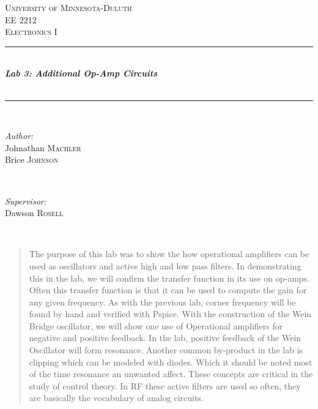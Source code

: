 \documentclass[10pt,a4paper]{article}
\begin{document}
\begin{titlepage}
\newcommand{\HRule}{\rule{\linewidth}{0.5mm}} %
\center %
\textsc{\LARGE University of Minnesota-Duluth}\\[1.5cm] %
\textsc{\Large EE 2212}\\[0.5cm] %
\textsc{\large Electronics I}\\[0.5cm] %
\HRule \\[0.4cm]
{ \huge \bfseries \emph{{\color{black}Lab 3: Additional Op-Amp Circuits  }}}\\[0.4cm] %
{\color{black}{\large \today}}\\
\HRule \\[1cm]


\begin{minipage}{0.4\textwidth}
\begin{flushleft} \large
\emph{Author:}\\
Johnathan \textsc{Machler}\\
Brice  \textsc{Johnson }
\end{flushleft}
\end{minipage}
~
\begin{minipage}{0.4\textwidth}
\begin{flushright} \large
\emph{Supervisor:} \\
Dawson \textsc{Rosell} %
\end{flushright}


\end{minipage}\\[1cm] %

\begin{abstract}
The purpose of this lab was to show the how operational amplifiers can be used as oscillators and active high and low pass filters. In demonstrating this in the lab, we will confirm the transfer function in its use on op-amps.  Often this transfer function is that it can be used to compute the gain for any given frequency. As with the previous lab, corner frequency will be found by hand and verified with Pspice. With the construction of the Wein Bridge oscillator, we will show one use of Operational amplifiers for negative and positive feedback. In the lab, positive feedback of the Wein Oscillator will form resonance. Another common by-product in the lab is clipping which can be modeled with diodes. Which it should be noted most of the time resonance an unwanted affect. These concepts are critical in the study of control theory. In RF these active filters are used so often, they are basically the vocabulary of analog circuits.
\end{abstract}
\vfill %
\end{titlepage}
\end{document}
